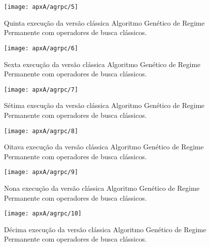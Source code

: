 \begin{figure}[H]
\centering
\texttt{[image: apxA/agrpc/5]}
\caption{Quinta execução da versão clássica Algoritmo Genético de Regime Permanente com operadores de busca clássicos.}
\label{fig:graphGRP1-05}
\end{figure}

\begin{figure}[H]
\centering
\texttt{[image: apxA/agrpc/6]}
\caption{Sexta execução da versão clássica Algoritmo Genético de Regime Permanente com operadores de busca clássicos.}
\label{fig:graphGRP1-06}
\end{figure}

\begin{figure}[H]
\centering
\texttt{[image: apxA/agrpc/7]}
\caption{Sétima execução da versão clássica Algoritmo Genético de Regime Permanente com operadores de busca clássicos.}
\label{fig:graphGRP1-07}
\end{figure}

\begin{figure}[H]
\centering
\texttt{[image: apxA/agrpc/8]}
\caption{Oitava execução da versão clássica Algoritmo Genético de Regime Permanente com operadores de busca clássicos.}
\label{fig:graphGRP1-08}
\end{figure}

\begin{figure}[H]
\centering
\texttt{[image: apxA/agrpc/9]}
\caption{Nona execução da versão clássica Algoritmo Genético de Regime Permanente com operadores de busca clássicos.}
\label{fig:graphGRP1-09}
\end{figure}

\begin{figure}[H]
\centering
\texttt{[image: apxA/agrpc/10]}
\caption{Décima execução da versão clássica Algoritmo Genético de Regime Permanente com operadores de busca clássicos.}
\label{fig:graphGRP1-10}
\end{figure}